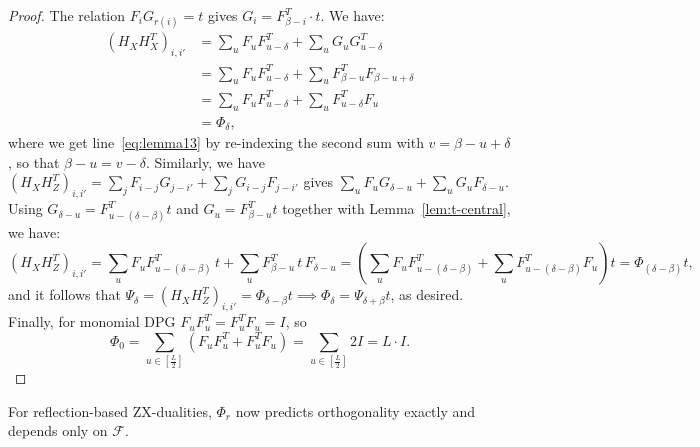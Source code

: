 \begin{proof}
The relation $F_iG_{r(i)} = t$ gives $G_i = F^T_{\beta-i}\cdot t$.  We have:
\begin{align}
    \left(H_XH_X^T\right)_{i,i'} 
    &= \sum_{u} F_uF^T_{u-\delta} + \sum_{u} G_uG^T_{u-\delta} \\
    &= \sum_{u} F_uF^T_{u-\delta} +\sum_{u} F^T_{\beta-u}F_{\beta-u+\delta}\\
    &=\sum_{u} F_uF^T_{u-\delta} + \sum_{u} F^T_{u-\delta}F_{u} \label{eq:lemma13}\\
    &=\Phi_\delta,
\end{align}
where we get line~\eqref{eq:lemma13} by re-indexing the second sum with $v = \beta-u+\delta$, so that $\beta - u = v-\delta$. Similarly, we have $(H_XH_Z^T)_{i,i'} = \sum_{j}F_{i-j}G_{j-i'} + \sum_{j}G_{i-j}F_{j-i'}$ gives $\sum_u F_uG_{\delta-u} + \sum_u G_uF_{\delta-u}$. Using $G_{\delta-u} = F^T_{u-(\delta-\beta)}t$ and $G_u = F^T_{\beta-u}t$ together with Lemma~\ref{lem:t-central}, we have:
\begin{equation*}
    \left(H_XH_Z^T\right)_{i,i'} = \sum_u F_uF^T_{u-(\delta-\beta)}\,t + \sum_{u} F^T_{\beta-u}\,t\,F_{\delta-u}
    = \left(\sum_u F_uF^T_{u-(\delta-\beta)} + \sum_{u} F^T_{u-(\delta-\beta)}F_u\right)t = \Phi_{(\delta-\beta)}t,
\end{equation*}
and it follows that $\Psi_\delta =\left(H_XH_Z^T\right)_{i,i'} = \Phi_{\delta - \beta} t\implies \Phi_{\delta} = \Psi_{\delta+\beta}t$, as desired. Finally, for monomial DPG $F_uF^T_u = F^T_uF_u = I$, so
\begin{equation*}
    \Phi_0 = \sum_{u\in[\frac L2]}\left(F_uF^T_u + F^T_uF_u\right) = \sum_{u\in[\frac L2]}2I = L\cdot I.
\end{equation*}
\end{proof}

For reflection-based ZX-dualities, $\Phi_r$ now predicts orthogonality exactly and depends only on $\mathcal F$.

